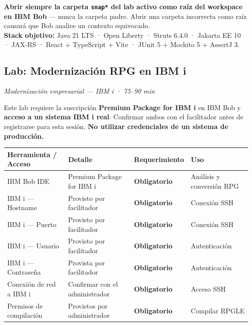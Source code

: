 \documentclass[11pt, a4paper]{article}
\newcommand{\req}[1]{\textbf{\textcolor{ibmred}{#1}}}
\begin{document}
\begin{criticalbox}
  \textbf{Abrir siempre la carpeta \texttt{snap*} del lab activo como raíz del workspace en IBM Bob} — nunca la carpeta padre. Abrir una carpeta incorrecta como raíz causará que Bob analice un contexto equivocado. \\[4pt]
  \textbf{Stack objetivo:} Java 21 LTS · Open Liberty · Struts 6.4.0 · Jakarta EE 10 · JAX-RS · React + TypeScript + Vite · JUnit 5 + Mockito 5 + AssertJ 3.
\end{criticalbox}

\subsection{Lab: Modernización RPG en IBM i}
\label{sec:ibmi}

\textit{Modernización empresarial — IBM i · 75--90 min}

\begin{criticalbox}
  Este lab requiere la suscripción \textbf{Premium Package for IBM i} en IBM Bob y \textbf{acceso a un sistema IBM i real}. Confirmar ambos con el facilitador antes de registrarse para esta sesión. \textbf{No utilizar credenciales de un sistema de producción.}
\end{criticalbox}

\vspace{10pt}
\begin{tabular}{@{}llll@{}}
\toprule
\textbf{Herramienta / Acceso} & \textbf{Detalle} & \textbf{Requerimiento} & \textbf{Uso} \\
\midrule
IBM Bob IDE & Premium Package for IBM i & \req{Obligatorio} & Análisis y conversión RPG \\
IBM i — Hostname & Provisto por facilitador & \req{Obligatorio} & Conexión SSH \\
IBM i — Puerto & Provisto por facilitador & \req{Obligatorio} & Conexión SSH \\
IBM i — Usuario & Provisto por facilitador & \req{Obligatorio} & Autenticación \\
IBM i — Contraseña & Provista por facilitador & \req{Obligatorio} & Autenticación \\
Conexión de red a IBM i & Confirmar con el administrador & \req{Obligatorio} & Acceso SSH \\
Permisos de compilación & Provistos por administrador & \req{Obligatorio} & Compilar RPGLE \\
\bottomrule
\end{tabular}
\end{document}
